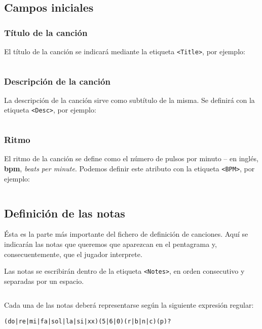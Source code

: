 \subsection{Campos iniciales}

\subsubsection{Título de la canción}


El título de la canción se indicará mediante la etiqueta \texttt{<Title>}, por ejemplo:

\inputminted{xml}{apendice_manual_canciones/snippet_1}

\subsubsection{Descripción de la canción}

La descripción de la canción sirve como subtítulo de la misma. Se definirá con
la etiqueta \texttt{<Desc>}, por ejemplo:

\inputminted{xml}{apendice_manual_canciones/snippet_2}

\subsubsection{Ritmo}

El ritmo de la canción se define como el número de pulsos por minuto -- en
inglés, \textbf{bpm}, \textit{beats per minute}. Podemos definir este atributo
con la etiqueta \texttt{<BPM>}, por ejemplo:

\inputminted{xml}{apendice_manual_canciones/snippet_3}

\subsection{Definición de las notas}

Ésta es la parte más importante del fichero de definición de canciones. Aquí se
indicarán las notas que queremos que aparezcan en el pentagrama y,
consecuentemente, que el jugador interprete.

Las notas se escribirán dentro de la etiqueta \texttt{<Notes>}, en orden
consecutivo y separadas por un espacio.

\inputminted{xml}{apendice_manual_canciones/snippet_4}

Cada una de las notas deberá representarse según la siguiente expresión
regular:
\begin{verbatim}
(do|re|mi|fa|sol|la|si|xx)(5|6|0)(r|b|n|c)(p)?
\end{verbatim}


